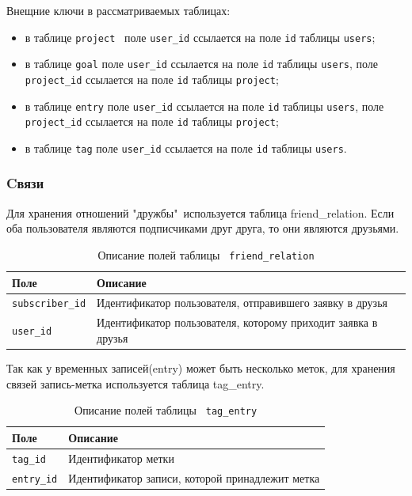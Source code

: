 Внещние ключи в рассматриваемых таблицах:
\begin{itemize}[leftmargin=1.6\parindent]
	\item в таблице \texttt{project}  поле \texttt{user\_id} ссылается на поле \texttt{id} таблицы \texttt{users};
	\item в таблице \texttt{goal} поле \texttt{user\_id} ссылается на поле \texttt{id} таблицы \texttt{users}, поле \texttt{project\_id} ссылается на поле \texttt{id} таблицы \texttt{project};
	\item в таблице \texttt{entry} поле \texttt{user\_id} ссылается на поле \texttt{id} таблицы \texttt{users}, поле \texttt{project\_id} ссылается на поле \texttt{id} таблицы \texttt{project};
	\item в таблице \texttt{tag} поле \texttt{user\_id} ссылается на поле \texttt{id} таблицы \texttt{users}.
\end{itemize}


\subsubsection*{Cвязи}

Для хранения отношений "дружбы"\ используется таблица friend\_relation. Если оба пользователя являются подписчиками друг друга, то они являются друзьями.

\begin{table}[!ht]
	\caption{Описание полей таблицы \texttt{ friend\_relation}}
	\label{tbl:friend}
	\begin{center}
		\begin{tabular}{|p{}|p{}|}
			\hline
			\textbf{Поле} & \textbf{Описание} \\\hline
			\texttt{subscriber\_id} & Идентификатор пользователя, отправившего заявку в друзья \\\hline
			\texttt{user\_id} & Идентификатор пользователя, которому приходит заявка в друзья\\\hline
		\end{tabular}
	\end{center}
\end{table}

Так как у временных записей(entry) может быть несколько меток, для хранения связей запись-метка используется таблица tag\_entry.

\begin{table}[!ht]
	\caption{Описание полей таблицы \texttt{ tag\_entry}}
	\label{tbl:tag_entry}
	\begin{center}
		\begin{tabular}{|p{}|p{}|}
			\hline
			\textbf{Поле} & \textbf{Описание} \\\hline
			\texttt{tag\_id} & Идентификатор метки \\\hline
			\texttt{entry\_id} & Идентификатор записи, которой принадлежит метка\\\hline
		\end{tabular}
	\end{center}
\end{table}

